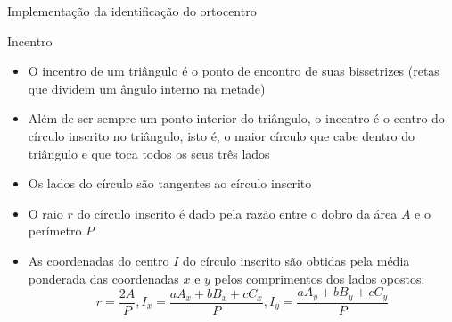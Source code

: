 \begin{frame}[fragile]{Implementação da identificação do ortocentro}
\end{frame}

\begin{frame}[fragile]{Incentro}

    \begin{itemize}
        \item O incentro de um triângulo é o ponto de encontro de suas bissetrizes (retas que dividem um ângulo interno na metade)

        \item Além de ser sempre um ponto interior do triângulo, o incentro é o centro do círculo inscrito no triângulo, isto é, o maior círculo que cabe dentro do triângulo e que toca todos os seus três lados 

        \item Os lados do círculo são tangentes ao círculo inscrito

        \item O raio $r$ do círculo inscrito é dado pela razão entre o dobro da área $A$ e o 
            perímetro $P$

        \item As coordenadas do centro $I$ do círculo inscrito são obtidas pela média ponderada 
            das coordenadas $x$ e $y$ pelos comprimentos dos lados opostos:
        \[
            r = \frac{2A}{P}, I_x = \frac{aA_x + bB_x + cC_x}{P}, I_y = \frac{aA_y + bB_y + cC_y}{P}
        \]
    \end{itemize}

\end{frame}

